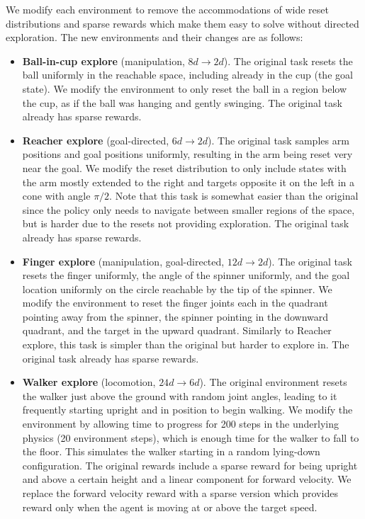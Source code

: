 \begin{subappendices}
We modify each environment to remove the accommodations of wide reset distributions and sparse rewards which make them easy to solve without directed exploration.
The new environments and their changes are as follows:
\begin{itemize}
    \item \textbf{Ball-in-cup explore} (manipulation, $8d \rightarrow 2d$). The original task resets the ball uniformly in the reachable space, including already in the cup (the goal state).
    We modify the environment to only reset the ball in a region below the cup, as if the ball was hanging and gently swinging.
    The original task already has sparse rewards.
    \item \textbf{Reacher explore} (goal-directed, $6d \rightarrow 2d$).
    The original task samples arm positions and goal positions uniformly, resulting in the arm being reset very near the goal.
    We modify the reset distribution to only include states with the arm mostly extended to the right and targets opposite it on the left in a cone with angle $\pi/2$.
    Note that this task is somewhat easier than the original since the policy only needs to navigate between smaller regions of the space, but is harder due to the resets not providing exploration.
    The original task already has sparse rewards.
    \item \textbf{Finger explore} (manipulation, goal-directed, $12d \rightarrow 2d$).
    The original task resets the finger uniformly, the angle of the spinner uniformly, and the goal location uniformly on the circle reachable by the tip of the spinner.
    We modify the environment to reset the finger joints each in the quadrant pointing away from the spinner, the spinner pointing in the downward quadrant, and the target in the upward quadrant.
    Similarly to Reacher explore, this task is simpler than the original but harder to explore in.
    The original task already has sparse rewards.
    \item \textbf{Walker explore} (locomotion, $24d \rightarrow 6d$).
    The original environment resets the walker just above the ground with random joint angles, leading to it frequently starting upright and in position to begin walking.
    We modify the environment by allowing time to progress for 200 steps in the underlying physics (20 environment steps), which is enough time for the walker to fall to the floor.
    This simulates the walker starting in a random lying-down configuration.
    The original rewards include a sparse reward for being upright and above a certain height and a linear component for forward velocity.
    We replace the forward velocity reward with a sparse version which provides reward only when the agent is moving at or above the target speed.
\end{itemize}


\end{subappendices}
